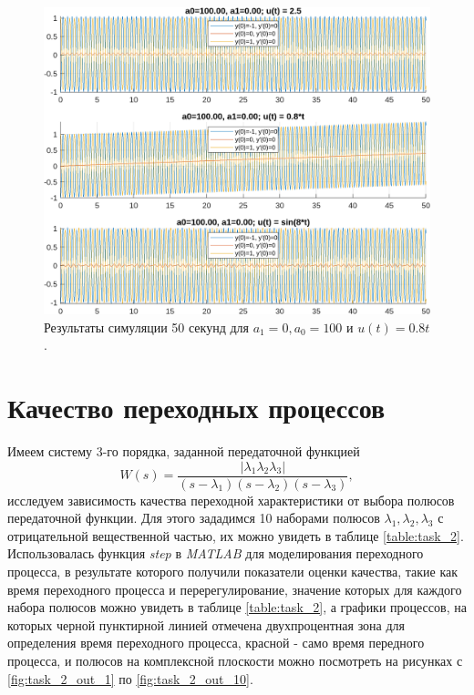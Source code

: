 \begin{figure}
    \centering
    \includegraphics[width=1\textwidth]{figs/task_1_out_21.png}
    \caption{Результаты симуляции 50 секунд для $a_1 = 0, a_0 = 100$ и $u(t) = 0.8t$.}
    \label{fig:task_1_out_21}
\end{figure}


\newpage
\section{Качество переходных процессов}

Имеем систему 3-го порядка, заданной передаточной функцией
\begin{equation*}
    W(s)=\frac{|\lambda_1 \lambda_2 \lambda_3|}{(s-\lambda_1)(s-\lambda_2)(s-\lambda_3)},
\end{equation*}
исследуем зависимость качества переходной характеристики от выбора полюсов передаточной 
функции. Для этого зададимся 10 наборами полюсов $\lambda_1, \lambda_2, \lambda_3$ с
отрицательной вещественной частью, их можно увидеть в таблице \ref{table:task_2}.
Использовалась функция \textit{step} в \textit{MATLAB} для моделирования переходного процесса,
в результате которого получили показатели оценки качества, такие как время переходного процесса
и перерегулирование, значение которых для каждого набора полюсов можно увидеть в таблице \ref{table:task_2},
а графики процессов, на которых черной пунктирной линией отмечена двухпроцентная зона для определения
время переходного процесса, красной - само время передного процесса, и полюсов на комплексной плоскости можно посмотреть на рисунках
с \ref{fig:task_2_out_1} по \ref{fig:task_2_out_10}. 

